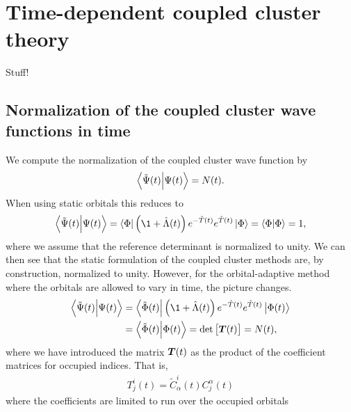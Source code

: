     \section{Time-dependent coupled cluster theory}
        Stuff!

        \subsection{Normalization of the coupled cluster wave functions in time}
            We compute the normalization of the coupled cluster wave function by
            \begin{align}
                \braket{\tilde{\Psi}(t)}{\Psi(t)} = N(t).
            \end{align}
            When using static orbitals this reduces to
            \begin{align}
                \braket{\tilde{\Psi}(t)}{\Psi(t)}
                = \bra{\slat}\para{
                    \1 + \clustl(t)
                } e^{-\clust(t)}
                e^{\clust(t)}
                \ket{\slat}
                = \braket{\slat}{\slat}
                = 1,
            \end{align}
            where we assume that the reference determinant is normalized to
            unity.
            We can then see that the static formulation of the coupled cluster
            methods are, by construction, normalized to unity.
            However, for the orbital-adaptive method where the orbitals are
            allowed to vary in time, the picture changes.
            \begin{align}
                \braket{\tilde{\Psi}(t)}{\Psi(t)}
                &=
                \bra{\tilde{\Phi}(t)}
                \para{
                    \1 + \clustl(t)
                }
                e^{-\clust(t)}
                e^{\clust(t)}
                \ket{\slat(t)}
                \\
                &= \braket{\tilde{\Phi}(t)}{\Phi(t)}
                = \det\brak{\vfg{T}(t)}
                = N(t),
                \label{eq:norm-oatdcc}
            \end{align}
            where we have introduced the matrix $\boldsymbol{T}(t)$ as the product of
            the coefficient matrices for occupied indices.
            That is,
            \begin{align}
                T^{i}_{j}(t) = \tilde{C}^{i}_{\alpha}(t) C^{\alpha}_j(t)
            \end{align}
            where the coefficients are limited to run over the occupied orbitals
